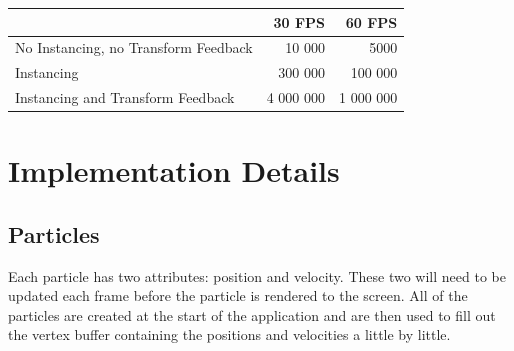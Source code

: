 \documentclass[report]{vgtc}
\begin{document}
\begin{table}[H]
	\begin{tabular}{l | r | r}
		  & 30 FPS & 60 FPS   \\[1.0ex] \hline
  		No Instancing, no Transform Feedback & 10 000 & 5000  \\[1.0ex]
  		Instancing & 300 000 & 100 000  \\[1.0ex]
		Instancing and Transform Feedback & 4 000 000 & 1 000 000 \\[1.0ex]
	\end{tabular}
\end{table}	


	\section{Implementation Details}	
	
	\subsection{Particles}

Each particle has two attributes: position and velocity. These two will need to be updated each frame before the particle is rendered to the screen. All of the particles are created at the start of the application and are then used to fill out the vertex buffer containing the positions and velocities a little by little.
\end{document}
